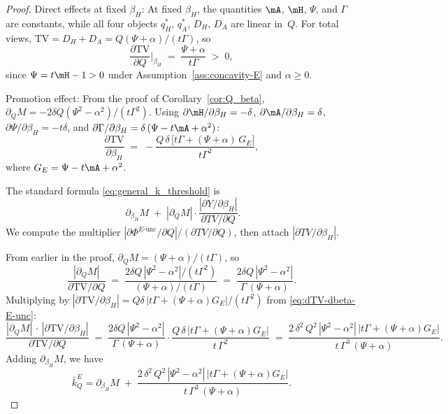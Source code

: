 \begin{proof}
Direct effects at fixed $\beta_H$:
At fixed $\beta_H$, the quantities $\mA$, $\mH$, $\Psi$, and $\Gamma$ are constants, while all four objects $q_H^*$, $q_A^*$, $D_H$, $D_A$ are linear in~$Q$. For total views, $\text{TV} = D_H + D_A = Q(\Psi + \alpha)/(t\Gamma)$, so
\[
\frac{\partial \text{TV}}{\partial Q}\bigg|_{\beta_H}
\;=\; \frac{\Psi + \alpha}{t\Gamma} \;>\; 0,
\]
since $\Psi = t\mH - 1 > 0$ under Assumption~\ref{ass:concavity-E} and $\alpha \ge 0$.


Promotion effect:
From the proof of Corollary~\ref{cor:Q_beta}, $\partial_Q M= -2\delta Q(\Psi^2 - \alpha^2)/(t\Gamma^2)$. Using $\partial\mH/\partial\beta_H = -\delta$, $\partial\mA/\partial\beta_H = \delta$, $\partial\Psi/\partial\beta_H = -t\delta$, and $\partial\Gamma/\partial\beta_H = \delta\,(\Psi - t\mA + \alpha^2)$:
\begin{equation}\label{eq:dTV-dbeta-E-unc}
\frac{\partial\text{TV}}{\partial\beta_H}
\;=\; -\frac{Q\,\delta\,\bigl[t\Gamma + (\Psi+\alpha)\,G_E\bigr]}{t\Gamma^2},
\end{equation}
where $G_E = \Psi - t\mA + \alpha^2$.


The standard formula \eqref{eq:general_k_threshold} is
\[
\; \partial_{\beta_H}M
\;+\; \left|\partial_QM\right|\cdot
\frac{|\partial Y/\partial\beta_H|}{\partial TV/\partial Q}.\]
We compute the multiplier $|\partial\Phi^{E\text{-unc}}/\partial Q|/(\partial TV/\partial Q)$, then attach $|\partial TV/\partial\beta_H|$.

From earlier in the proof, $\partial_Q M = (\Psi+\alpha)/(t\Gamma)$, so
\[
\frac{|\partial_Q M|}{\partial\text{TV}/\partial Q}
\;=\; \frac{2\delta Q\,|\Psi^2 - \alpha^2|/(t\Gamma^2)}{(\Psi+\alpha)/(t\Gamma)}
\;=\; \frac{2\delta Q\,|\Psi^2 - \alpha^2|}{\Gamma\,(\Psi + \alpha)}.
\]
Multiplying by $|\partial\text{TV}/\partial\beta_H| = Q\delta\,|t\Gamma + (\Psi+\alpha)G_E|/(t\Gamma^2)$ from \eqref{eq:dTV-dbeta-E-unc}:
\[
\frac{|\partial_Q M|\,\cdot\,|\partial\text{TV}/\partial\beta_H|}{\partial\text{TV}/\partial Q}
\;=\; \frac{2\delta Q\,|\Psi^2 - \alpha^2|}{\Gamma\,(\Psi + \alpha)}
\cdot \frac{Q\,\delta\,|t\Gamma + (\Psi+\alpha)G_E|}{t\,\Gamma^2}
\;=\; \frac{2\,\delta^{2}\,Q^{2}\,|\Psi^{2}-\alpha^{2}|\,\bigl|t\Gamma + (\Psi+\alpha)G_E\bigr|}{t\,\Gamma^{3}\,(\Psi+\alpha)}.
\]
Adding $\partial_{\beta_H}M$, we have
\begin{equation}\label{eq:kbar-Q-TV-E-unc}
\bar{k}_Q^E = \partial_{\beta_H}M
\;+\; \frac{2\,\delta^{2}\,Q^{2}\,|\Psi^{2}-\alpha^{2}|\,\bigl|t\Gamma + (\Psi+\alpha)G_E\bigr|}{t\,\Gamma^{3}\,(\Psi+\alpha)}.
\end{equation}


\end{proof}
